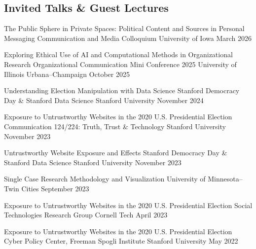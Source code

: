 \subsection{Invited Talks \& Guest Lectures}

\cvtalk
  {The Public Sphere in Private Spaces: Political Content and Sources in Personal Messaging}
  {Communication and Media Colloquium}
  {University of Iowa}
  {March 2026}

\cvtalk
  {Exploring Ethical Use of AI and Computational Methods in Organizational Research}
  {Organizational Communication Mini Conference 2025}
  {University of Illinois Urbana--Champaign}
  {October 2025}

\cvtalk
  {Understanding Election Manipulation with Data Science}
  {Stanford Democracy Day \& Stanford Data Science}
  {Stanford University}
  {November 2024}

\cvtalk
  {Exposure to Untrustworthy Websites in the 2020 U.S. Presidential Election}
  {Communication 124/224: Truth, Trust \& Technology}
  {Stanford University}
  {November 2023}

\cvtalk
  {Untrustworthy Website Exposure and Effects}
  {Stanford Democracy Day \& Stanford Data Science}
  {Stanford University}
  {November 2023}

\cvtalk
  {Single Case Research Methodology and Visualization}
  {}
  {University of Minnesota--Twin Cities}
  {September 2023}

\cvtalk
  {Exposure to Untrustworthy Websites in the 2020 U.S. Presidential Election}
  {Social Technologies Research Group}
  {Cornell Tech}
  {April 2023}

\cvtalk
  {Exposure to Untrustworthy Websites in the 2020 U.S. Presidential Election}
  {Cyber Policy Center, Freeman Spogli Institute}
  {Stanford University}
  {May 2022}
